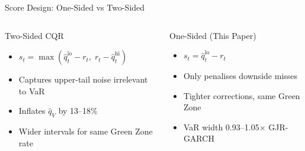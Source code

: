 \documentclass[9pt, aspectratio=169, t]{beamer}
\newcommand{\qV}{\hat{q}_V}
\begin{document}
\begin{frame}{Score Design: One-Sided vs Two-Sided}
	\begin{columns}[T]
		\begin{alertblock}{Two-Sided CQR}
		\begin{itemize}\setlength{\itemsep}{2pt}
			\item $s_t = \max(\hat{q}_t^{\mathrm{lo}} - r_t,\; r_t - \hat{q}_t^{\mathrm{hi}})$
			\item Captures upper-tail noise irrelevant to VaR
			\item Inflates $\qV$ by 13--18\%
			\item Wider intervals for same Green Zone rate
		\end{itemize}
		\end{alertblock}

		\begin{exampleblock}{One-Sided (This Paper)}
		\begin{itemize}\setlength{\itemsep}{2pt}
			\item $s_t = \hat{q}_t^{\mathrm{lo}} - r_t$
			\item Only penalises downside misses
			\item Tighter corrections, same Green Zone
			\item VaR width 0.93--1.05$\times$ GJR-GARCH
		\end{itemize}
		\end{exampleblock}
	\end{columns}
\end{frame}
\end{document}
